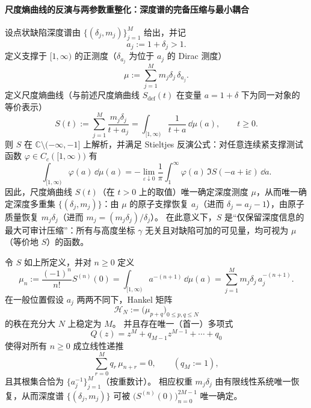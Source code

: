 \paragraph{尺度熵曲线的反演与两参数重整化：深度谱的完备压缩与最小耦合}

\begin{proposition}\label{prop:xi-scale-entropy-stieltjes-inversion-complete}
设点状缺陷深度谱由 \(\{(\delta_j,m_j)\}_{j=1}^{M}\) 给出，并记
\[
a_j:=1+\delta_j>1.
\]
定义支撑于 \([1,\infty)\) 的正测度（\(\delta_{a_j}\) 为位于 \(a_j\) 的 Dirac 测度）
\[
\mu:=\sum_{j=1}^{M} m_j\delta_j\,\delta_{a_j}.
\]
定义尺度熵曲线（与前述尺度熵曲线 \(S_{\mathrm{def}}(t)\) 在变量 \(a=1+\delta\) 下为同一对象的等价表示）
\[
S(t):=\sum_{j=1}^{M}\frac{m_j\delta_j}{t+a_j}
=\int_{[1,\infty)}\frac{1}{t+a}\,\dd\mu(a),
\qquad t\ge 0.
\]
则 \(S\) 在 \(\mathbb{C}\setminus(-\infty,-1]\) 上解析，并满足 Stieltjes 反演公式：对任意连续紧支撑测试函数 \(\varphi\in C_c([1,\infty))\) 有
\[
\int_{[1,\infty)}\varphi(a)\,\dd\mu(a)
=-\lim_{\varepsilon\downarrow0}\frac{1}{\pi}\int_{1}^{\infty}\varphi(a)\,\Im S(-a+\mathrm{i}\varepsilon)\,\dd a.
\]
因此，尺度熵曲线 \(S(t)\)（在 \(t>0\) 上的取值）唯一确定深度测度 \(\mu\)，从而唯一确定深度多重集 \(\{(\delta_j,m_j)\}\)：由 \(\mu\) 的原子支撑恢复 \(a_j\)（进而 \(\delta_j=a_j-1\)），由原子质量恢复 \(m_j\delta_j\)（进而 \(m_j=(m_j\delta_j)/\delta_j\)）。
在此意义下，\(S\) 是“仅保留深度信息的最大可审计压缩”：所有与高度坐标 \(\gamma\) 无关且对缺陷可加的可见量，均可视为 \(\mu\)（等价地 \(S\)）的函数。
 \end{proposition}

\begin{proposition}
令 \(S\) 如上所定义，并对 \(n\ge0\) 定义
\[
\mu_n:=\frac{(-1)^n}{n!}S^{(n)}(0)
=\int_{[1,\infty)}a^{-(n+1)}\,\dd\mu(a)
=\sum_{j=1}^{M}m_j\delta_j\,a_j^{-(n+1)}.
\]
在一般位置假设 \(a_j\) 两两不同下，Hankel 矩阵
\[
\mathcal{H}_N:=\bigl(\mu_{p+q}\bigr)_{0\le p,q\le N}
\]
的秩在充分大 \(N\) 上稳定为 \(M\)。
并且存在唯一（首一）多项式
\[
Q(z)=z^{M}+q_{M-1}z^{M-1}+\cdots+q_0
\]
使得对所有 \(n\ge0\) 成立线性递推
\[
\sum_{r=0}^{M}q_r\,\mu_{n+r}=0,\qquad (q_M:=1),
\]
且其根集合恰为 \(\{a_j^{-1}\}_{j=1}^{M}\)（按重数计）。
相应权重 \(m_j\delta_j\) 由有限线性系统唯一恢复，从而深度谱 \(\{(\delta_j,m_j)\}\) 可被 \(\bigl(S^{(n)}(0)\bigr)_{n=0}^{2M-1}\) 唯一确定。
\end{proposition}

